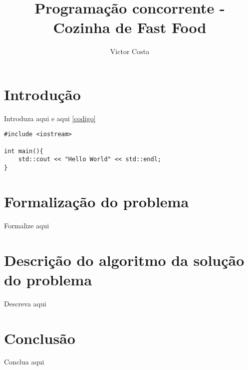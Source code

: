 \documentclass[a4paper]{article}
\title{Programação concorrente - Cozinha de Fast Food}
\author{Victor Costa}
\begin{document}
\maketitle

\section{Introdução}

Introduza aqui\cite{Teste} e aqui \ref{codigo} 
\begin{lstlisting}[caption=Código\label{codigo}]
#include <iostream>

int main(){
	std::cout << "Hello World" << std::endl;
}
\end{lstlisting}


\section{Formalização do problema}

Formalize aqui

\section{Descrição do algoritmo da solução do problema}

Descreva aqui

\section{Conclusão}

Conclua aqui

\printbibliography
\end{document}
